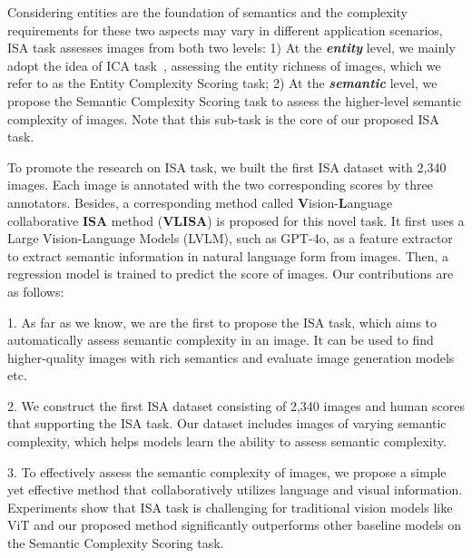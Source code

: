 Considering entities are the foundation of semantics and the complexity requirements for these two aspects may vary in different application scenarios, ISA task assesses images from both two levels: 
1) At the \textbf{\textit{entity}} level, we mainly adopt the idea of ICA task~\cite{ic9600}, assessing the entity richness of images, which we refer to as the Entity Complexity Scoring task; 
2) At the \textbf{\textit{semantic}} level, we propose the Semantic Complexity Scoring task to assess the higher-level semantic complexity of images. Note that this sub-task is the core of our proposed ISA task.

To promote the research on ISA task, we built the first ISA dataset with 2,340 images.
Each image is annotated with the two corresponding scores by three annotators.
Besides, a corresponding method called \textbf{V}ision-\textbf{L}anguage collaborative \textbf{ISA} method (\textbf{VLISA}) is proposed for this novel task. 
It first uses a Large Vision-Language Models (LVLM), such as GPT-4o, as a feature extractor to extract semantic information in natural language form from images. 
Then, a regression model is trained to predict the score of images.
Our contributions are as follows:

1. As far as we know, we are the first to propose the ISA task, which aims to automatically assess semantic complexity in an image. 
It can be used to find higher-quality images with rich semantics and evaluate image generation models etc. 

2. We construct the first ISA dataset consisting of 2,340 images and human scores that supporting the ISA task. Our dataset includes images of varying semantic complexity, which helps models learn the ability to assess semantic complexity.

3. To effectively assess the semantic complexity of images, we propose a simple yet effective method that collaboratively utilizes language and visual information.
Experiments show that ISA task is challenging for traditional vision models like ViT and our proposed method significantly outperforms other baseline models on the Semantic Complexity Scoring task.
